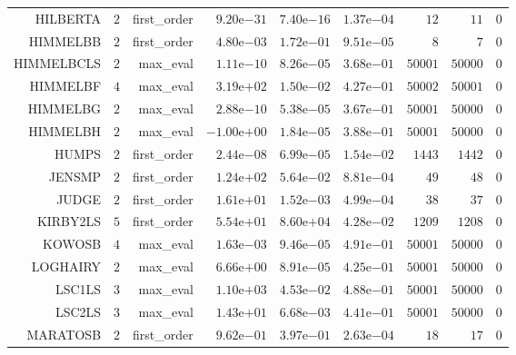 \begin{longtable}{rrrrrrrrr}
HILBERTA & \(     2\) & first\_order & \( 9.20\)e\(-31\) & \( 7.40\)e\(-16\) & \( 1.37\)e\(-04\) & \(    12\) & \(    11\) & \(     0\) \\
HIMMELBB & \(     2\) & first\_order & \( 4.80\)e\(-03\) & \( 1.72\)e\(-01\) & \( 9.51\)e\(-05\) & \(     8\) & \(     7\) & \(     0\) \\
HIMMELBCLS & \(     2\) & max\_eval & \( 1.11\)e\(-10\) & \( 8.26\)e\(-05\) & \( 3.68\)e\(-01\) & \( 50001\) & \( 50000\) & \(     0\) \\
HIMMELBF & \(     4\) & max\_eval & \( 3.19\)e\(+02\) & \( 1.50\)e\(-02\) & \( 4.27\)e\(-01\) & \( 50002\) & \( 50001\) & \(     0\) \\
HIMMELBG & \(     2\) & max\_eval & \( 2.88\)e\(-10\) & \( 5.38\)e\(-05\) & \( 3.67\)e\(-01\) & \( 50001\) & \( 50000\) & \(     0\) \\
HIMMELBH & \(     2\) & max\_eval & \(-1.00\)e\(+00\) & \( 1.84\)e\(-05\) & \( 3.88\)e\(-01\) & \( 50001\) & \( 50000\) & \(     0\) \\
HUMPS & \(     2\) & first\_order & \( 2.44\)e\(-08\) & \( 6.99\)e\(-05\) & \( 1.54\)e\(-02\) & \(  1443\) & \(  1442\) & \(     0\) \\
JENSMP & \(     2\) & first\_order & \( 1.24\)e\(+02\) & \( 5.64\)e\(-02\) & \( 8.81\)e\(-04\) & \(    49\) & \(    48\) & \(     0\) \\
JUDGE & \(     2\) & first\_order & \( 1.61\)e\(+01\) & \( 1.52\)e\(-03\) & \( 4.99\)e\(-04\) & \(    38\) & \(    37\) & \(     0\) \\
KIRBY2LS & \(     5\) & first\_order & \( 5.54\)e\(+01\) & \( 8.60\)e\(+04\) & \( 4.28\)e\(-02\) & \(  1209\) & \(  1208\) & \(     0\) \\
KOWOSB & \(     4\) & max\_eval & \( 1.63\)e\(-03\) & \( 9.46\)e\(-05\) & \( 4.91\)e\(-01\) & \( 50001\) & \( 50000\) & \(     0\) \\
LOGHAIRY & \(     2\) & max\_eval & \( 6.66\)e\(+00\) & \( 8.91\)e\(-05\) & \( 4.25\)e\(-01\) & \( 50001\) & \( 50000\) & \(     0\) \\
LSC1LS & \(     3\) & max\_eval & \( 1.10\)e\(+03\) & \( 4.53\)e\(-02\) & \( 4.88\)e\(-01\) & \( 50001\) & \( 50000\) & \(     0\) \\
LSC2LS & \(     3\) & max\_eval & \( 1.43\)e\(+01\) & \( 6.68\)e\(-03\) & \( 4.41\)e\(-01\) & \( 50001\) & \( 50000\) & \(     0\) \\
MARATOSB & \(     2\) & first\_order & \( 9.62\)e\(-01\) & \( 3.97\)e\(-01\) & \( 2.63\)e\(-04\) & \(    18\) & \(    17\) & \(     0\) \\

\end{longtable}
